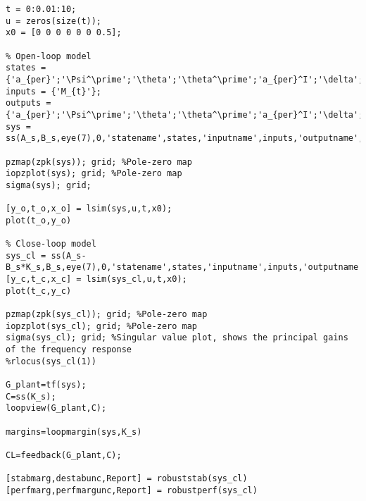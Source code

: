 \begin{lstlisting}[style=codematlab]
%% State space model
t = 0:0.01:10;
u = zeros(size(t));
x0 = [0 0 0 0 0 0 0.5];

% Open-loop model
states = {'a_{per}';'\Psi^\prime';'\theta';'\theta^\prime';'a_{per}^I';'\delta';'\delta^\prime'};
inputs = {'M_{t}'};
outputs = {'a_{per}';'\Psi^\prime';'\theta';'\theta^\prime';'a_{per}^I';'\delta';'\delta^\prime'};
sys = ss(A_s,B_s,eye(7),0,'statename',states,'inputname',inputs,'outputname',outputs);

pzmap(zpk(sys)); grid; %Pole-zero map
iopzplot(sys); grid; %Pole-zero map
sigma(sys); grid;

[y_o,t_o,x_o] = lsim(sys,u,t,x0); 
plot(t_o,y_o)

% Close-loop model
sys_cl = ss(A_s-B_s*K_s,B_s,eye(7),0,'statename',states,'inputname',inputs,'outputname',outputs); 
[y_c,t_c,x_c] = lsim(sys_cl,u,t,x0);
plot(t_c,y_c)

pzmap(zpk(sys_cl)); grid; %Pole-zero map
iopzplot(sys_cl); grid; %Pole-zero map
sigma(sys_cl); grid; %Singular value plot, shows the principal gains of the frequency response
%rlocus(sys_cl(1))

G_plant=tf(sys);
C=ss(K_s);
loopview(G_plant,C);

margins=loopmargin(sys,K_s)

CL=feedback(G_plant,C);

[stabmarg,destabunc,Report] = robuststab(sys_cl) 
[perfmarg,perfmargunc,Report] = robustperf(sys_cl) 

\end{lstlisting}
